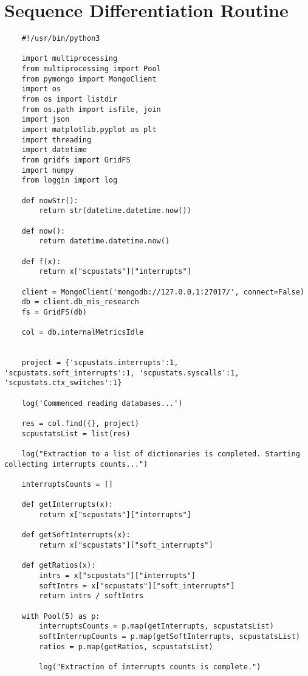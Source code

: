 \chapter{Sequence Differentiation Routine}
\begin{code}
    \begin{verbatim}
    #!/usr/bin/python3

    import multiprocessing
    from multiprocessing import Pool
    from pymongo import MongoClient
    import os
    from os import listdir
    from os.path import isfile, join
    import json
    import matplotlib.pyplot as plt
    import threading
    import datetime
    from gridfs import GridFS
    import numpy
    from loggin import log
    
    def nowStr():
    	return str(datetime.datetime.now())
    
    def now():
    	return datetime.datetime.now()
    
    def f(x):
    	return x["scpustats"]["interrupts"]
    
    client = MongoClient('mongodb://127.0.0.1:27017/', connect=False)
    db = client.db_mis_research
    fs = GridFS(db)
    
    col = db.internalMetricsIdle
    
    
    project = {'scpustats.interrupts':1, 'scpustats.soft_interrupts':1, 'scpustats.syscalls':1, 'scpustats.ctx_switches':1}
    
    log('Commenced reading databases...')
    
    res = col.find({}, project)
    scpustatsList = list(res)
    
    log("Extraction to a list of dictionaries is completed. Starting collecting interrupts counts...")
    
    interruptsCounts = []
    
    def getInterrupts(x):
    	return x["scpustats"]["interrupts"]
    
    def getSoftInterrupts(x):
    	return x["scpustats"]["soft_interrupts"]
    
    def getRatios(x):
    	intrs = x["scpustats"]["interrupts"]
    	softIntrs = x["scpustats"]["soft_interrupts"]
    	return intrs / softIntrs
    
    with Pool(5) as p:
    	interruptsCounts = p.map(getInterrupts, scpustatsList)
    	softInterrupCounts = p.map(getSoftInterrupts, scpustatsList)
    	ratios = p.map(getRatios, scpustatsList)
    
    	log("Extraction of interrupts counts is complete.")
    

\end{verbatim}
\end{code}
